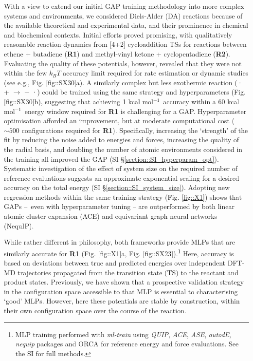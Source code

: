 \documentclass[twoside,twocolumn,9pt]{article}
\newcommand{\kcal}{kcal mol$^{-1}$}
\begin{document}
With a view to extend our initial GAP training methodology\cite{Young2021gap} into more complex systems and environments, we considered Diels-Alder (DA) reactions because of the available theoretical and experimental data,\cite{Black2012, Lording2020} and their prominence in chemical and biochemical contexts.\cite{Sato2021, MartCentelles2018, Briou2021} Initial efforts proved promising,\cite{Young2021gt} with qualitatively reasonable reaction dynamics from [4+2] cycloaddition TSs for reactions between ethene + butadiene ({\bfseries{R1}}) and methyl-vinyl ketone + cyclopentadiene ({\bfseries{R2}}). Evaluating the quality of these potentials, however, revealed that they were not within the few $k_BT$ accuracy limit required for rate estimation or dynamic studies (see e.g., Fig. {\ref{fig::SX30}}a). A similarly complex but less exothermic reaction ({· +  $\rightarrow$  + ·}) could be trained using the same strategy and hyperparameters (Fig. \ref{fig::SX30}b), suggesting that achieving 1 \kcal~accuracy within a 60 \kcal~energy window required for {\bfseries{R1}} is challenging for a GAP. Hyperparameter optimisation afforded an improvement, but at moderate computational cost ($\sim500$ configurations required for {\bfseries{R1}}). Specifically, increasing the `strength’ of the fit by reducing the noise added to energies and forces, increasing the quality of the radial basis, and doubling the number of atomic environments considered in the training all improved the GAP (SI §\ref{section::SI_hyperparam_opt}). Systematic investigation of the effect of system size on the required number of reference evaluations suggests an approximate exponential scaling for a desired accuracy on the total energy (SI §\ref{section::SI_system_size}). Adopting new regression methods within the same training strategy (Fig. \ref{fig::X1}) shows that GAPs – even with hyperparameter tuning – are outperformed by both linear atomic cluster expansion (ACE\cite{Drautz2019}) and equivariant graph neural networks (NequIP\cite{Batzner2021}). 

While rather different in philosophy, both frameworks provide MLPs that are similarly accurate for {\bfseries{R1}} (Fig. \ref{fig::X1}a, Fig. \ref{fig::SX23}).\footnote[4]{MLP training performed with \emph{ml-train}\cite{Young2021mlt} using \emph{QUIP},\cite{Csanyi_libAtoms_QUIP_2021} \emph{ACE},\cite{Ortner_ACE} \emph{ASE},\cite{HjorthLarsen2017} \emph{autodE},\cite{autodE} \emph{nequip}\cite{nequip_github} packages and ORCA\cite{Neese2017} for reference energy and force evaluations. See the SI for full methods.} Here, accuracy is based on deviations between true and predicted energies over independent DFT-MD trajectories propagated from the transition state (TS) to the reactant and product states. Previously, we have shown that a prospective validation strategy in the configuration space accessible to that MLP is essential to characterising `good’ MLPs.\cite{Young2021gap} However, here these potentials are stable by construction, within their own configuration space over the course of the reaction.
\end{document}
